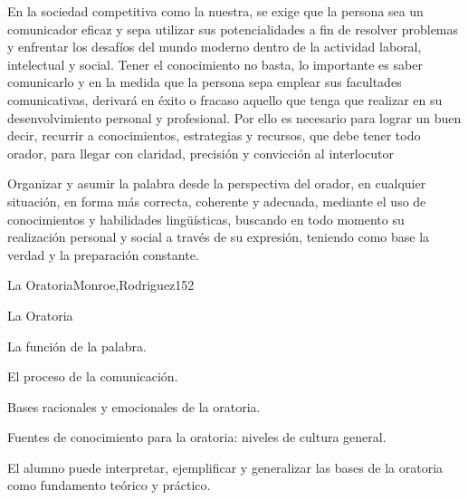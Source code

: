 \begin{syllabus}


\begin{justification}
En la sociedad competitiva como la nuestra,  se exige que la persona sea un comunicador eficaz y  sepa utilizar sus potencialidades a fin de resolver problemas y enfrentar los desafíos del mundo moderno dentro de la actividad laboral, intelectual y social. Tener el conocimiento no basta, lo importante es saber comunicarlo y en la medida que la persona sepa emplear sus facultades comunicativas, derivará en éxito o fracaso aquello que tenga que realizar en su desenvolvimiento personal y profesional. Por ello es necesario para lograr un buen decir, recurrir a conocimientos, estrategias y recursos, que debe tener todo orador, para llegar con claridad, precisión y convicción al interlocutor
\end{justification}

\begin{goals}
\item Organizar y asumir la palabra desde la perspectiva del orador, en cualquier situación, en forma más correcta, coherente  y adecuada, mediante el uso de conocimientos y habilidades lingüísticas, buscando en todo momento su realización personal y social  a través de su expresión, teniendo como base  la verdad y la preparación constante.  
\end{goals}

\begin{outcomes}
\end{outcomes}

\begin{unit}{La Oratoria}{Monroe,Rodriguez}{15}{2}
\begin{topics}
	\item La Oratoria
	\item La función de la palabra.
	\item El proceso de la comunicación.
	\item Bases racionales y emocionales de la oratoria.
	\item Fuentes de conocimiento para la oratoria: niveles de cultura general.
\end{topics}
\begin{learningoutcomes}
	\item El alumno puede interpretar, ejemplificar y generalizar las bases de la oratoria como fundamento teórico  y  práctico.
\end{learningoutcomes}
\end{unit}


\end{syllabus}
